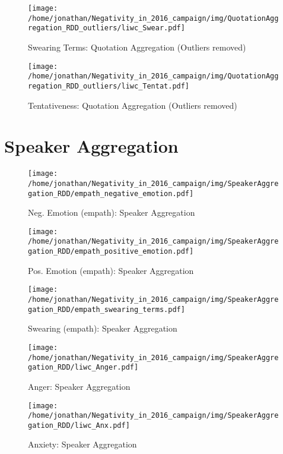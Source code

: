 \begin{figure}[h]\centering
\texttt{[image: /home/jonathan/Negativity\_in\_2016\_campaign/img/QuotationAggregation\_RDD\_outliers/liwc\_Swear.pdf]}
\caption{Swearing Terms: Quotation Aggregation (Outliers removed)}
\label{fig: qa_Swearing Terms}
\end
{figure}

\begin{figure}[h]\centering
\texttt{[image: /home/jonathan/Negativity\_in\_2016\_campaign/img/QuotationAggregation\_RDD\_outliers/liwc\_Tentat.pdf]}
\caption{Tentativeness: Quotation Aggregation (Outliers removed)}
\label{fig: qa_Tentativeness}
\end
{figure}

\clearpage
\pagebreak

\section{Speaker Aggregation}

\begin{figure}[h]\centering
\texttt{[image: /home/jonathan/Negativity\_in\_2016\_campaign/img/SpeakerAggregation\_RDD/empath\_negative\_emotion.pdf]}
\caption{Neg. Emotion (empath): Speaker Aggregation}
\label{fig: sa_Neg. Emotion (empath)}
\end
{figure}

\begin{figure}[h]\centering
\texttt{[image: /home/jonathan/Negativity\_in\_2016\_campaign/img/SpeakerAggregation\_RDD/empath\_positive\_emotion.pdf]}
\caption{Pos. Emotion (empath): Speaker Aggregation}
\label{fig: sa_Pos. Emotion (empath)}
\end
{figure}

\begin{figure}[h]\centering
\texttt{[image: /home/jonathan/Negativity\_in\_2016\_campaign/img/SpeakerAggregation\_RDD/empath\_swearing\_terms.pdf]}
\caption{Swearing (empath): Speaker Aggregation}
\label{fig: sa_Swearing (empath)}
\end
{figure}

\begin{figure}[h]\centering
\texttt{[image: /home/jonathan/Negativity\_in\_2016\_campaign/img/SpeakerAggregation\_RDD/liwc\_Anger.pdf]}
\caption{Anger: Speaker Aggregation}
\label{fig: sa_Anger}
\end
{figure}

\begin{figure}[h]\centering
\texttt{[image: /home/jonathan/Negativity\_in\_2016\_campaign/img/SpeakerAggregation\_RDD/liwc\_Anx.pdf]}
\caption{Anxiety: Speaker Aggregation}
\label{fig: sa_Anxiety}
\end
{figure}

